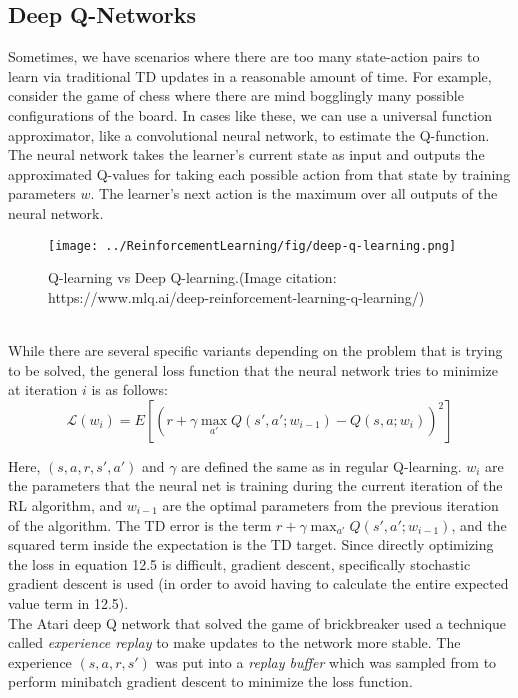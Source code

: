 \subsection{Deep Q-Networks}
Sometimes, we have scenarios where there are too many state-action pairs to learn via traditional TD updates in a reasonable amount of time. For example, consider the game of chess where there are mind bogglingly many possible configurations of the board. In cases like these, we can use a universal function approximator, like a convolutional neural network, to estimate the Q-function. The neural network takes the learner's current state as input and outputs the approximated Q-values for taking each possible action from that state by training parameters $w$. The learner's next action is the maximum over all outputs of the neural network.
\begin{figure}[ht!]
    \centering
    \texttt{[image: ../ReinforcementLearning/fig/deep-q-learning.png]}
    \caption{Q-learning vs Deep Q-learning.(Image citation: https://www.mlq.ai/deep-reinforcement-learning-q-learning/)}
    \label{fig:my_label}
\end{figure}\\
While there are several specific variants depending on the problem that is trying to be solved, the general loss function that the neural network tries to minimize at iteration $i$ is as follows:
\begin{equation}
    \mathcal{L}(w_i) = E[(r + \gamma\max_{a'}Q(s', a'; w_{i-1}) - Q(s, a; w_i))^2]
\end{equation}

Here, $(s, a, r, s', a')$ and $\gamma$ are defined the same as in regular Q-learning. $w_i$ are the parameters that the neural net is training during the current iteration of the RL algorithm, and $w_{i-1}$ are the optimal parameters from the previous iteration of the algorithm. The TD error is the term $r + \gamma\max_{a'}Q(s', a';w_{i-1})$, and the squared term inside the expectation is the TD target. Since directly optimizing the loss in equation 12.5 is difficult, gradient descent, specifically stochastic gradient descent is used (in order to avoid having to calculate the entire expected value term in 12.5).\\

The Atari deep Q network that solved the game of brickbreaker used a technique called \textit{experience replay} to make updates to the network more stable. The experience $(s, a, r, s')$ was put into a \textit{replay buffer} which was sampled from to perform minibatch gradient descent to minimize the loss function.
